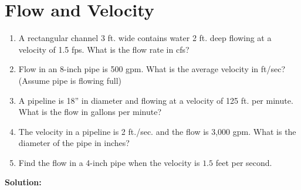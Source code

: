 \documentclass{article}
\begin{document}
\vspace{1cm}
\section{Flow and Velocity}
\begin{enumerate}

\item A rectangular channel 3 ft. wide contains water 2 ft. deep flowing at a velocity of 1.5 fps.
What is the flow rate in cfs?

\item Flow in an 8-inch pipe is 500 gpm. What is the average velocity in ft/sec? (Assume pipe is flowing full)

\item A pipeline is 18” in diameter and flowing at a velocity of 125 ft. per minute. What is the flow in gallons per minute?

\item The velocity in a pipeline is 2 ft./sec. and the flow is 3,000 gpm. What is the diameter of the pipe in inches?



\item Find the flow in a 4-inch pipe when the velocity is $1.5$ feet per second.


\end{enumerate}

\textbf{Solution:}\\
\end{document}

